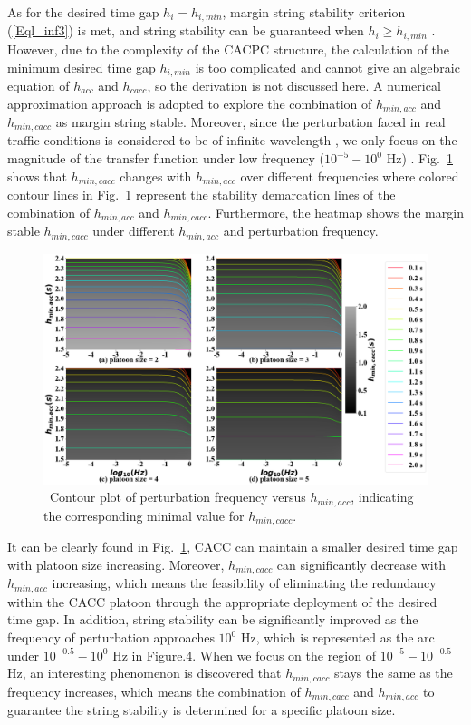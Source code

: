 \documentclass[a4paper,fleqn]{cas-sc}
\begin{document}
As for the desired time gap $h_i=h_{i,min}$, margin string stability criterion (\ref{Eql_inf3}) is met, and string stability can be guaranteed when $h_i\ge h_{i,min}$  \citep{naus2010string}. However, due to the complexity of the CACPC structure, the calculation of the minimum desired time gap $h_{i,min}$ is too complicated and cannot give an algebraic equation of $h_{acc}$ and $h_{cacc}$, so the derivation is not discussed here. A numerical approximation approach is adopted to explore the combination of $h_{min,acc}$ and $h_{min,cacc}$ as margin string stable. Moreover, since the perturbation faced in real traffic conditions is considered to be of infinite wavelength \citep{bian2019reducing,xiao2011practical}, we only focus on the magnitude of the transfer function under low frequency ($10^{-5} - 10^0$ Hz) \citep{Oncu2014}. Fig.~\ref{fig4} shows that $h_{min,cacc}$ changes with $h_{min,acc}$ over different frequencies where colored contour lines in Fig.~\ref{fig4} represent the stability demarcation lines of the combination of $h_{min,acc}$ and  $h_{min,cacc}$. Furthermore, the heatmap shows the margin stable $h_{min,cacc}$ under different $h_{min,acc}$ and perturbation frequency.

\begin{figure}
  \centering
  \includegraphics[width=14cm]{figs/fig4.png}
  \caption{~Contour plot of perturbation frequency versus $h_{min,acc}$, indicating the corresponding minimal value for $h_{min,cacc}$.}
  \label{fig4}
\end{figure}

It can be clearly found in Fig.~\ref{fig4}, CACC can maintain a smaller desired time gap with platoon size increasing. Moreover, $h_{min,cacc}$ can significantly decrease with $h_{min,acc}$ increasing, which means the feasibility of eliminating the redundancy within the CACC platoon through the appropriate deployment of the desired time gap. In addition, string stability can be significantly improved as the frequency of perturbation approaches $10^0$ Hz, which is represented as the arc under $10^{-0.5} - 10^0$ Hz in Figure.4. When we focus on the region of $10^{-5} - 10^{-0.5}$ Hz, an interesting phenomenon is discovered that $h_{min,cacc}$ stays the same as the frequency increases, which means the combination of $h_{min,cacc}$ and $h_{min,acc}$ to guarantee the string stability is determined for a specific platoon size.
\end{document}
